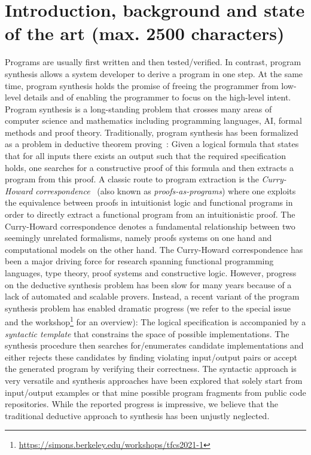 \documentclass[a4paper,12pt]{article}
\begin{document}
\section{Introduction, background and state of the art (max. 2500 characters)}
Programs are usually first written and then tested/verified.
In contrast, program synthesis allows a system developer to derive a program in one step.
At the same time, program synthesis holds the promise of freeing the programmer from low-level details and of enabling the programmer to focus on the high-level intent.
Program synthesis is a long-standing problem that crosses many areas of computer science and mathematics including programming languages, AI, formal methods and proof theory.
Traditionally, program synthesis has been formalized as a problem in deductive theorem proving~\cite{conf/ijcai/MannaW79}:
Given a logical formula that states that for all inputs there exists an output such that the required specification holds, one searches for a constructive proof of this formula and then extracts a program from this proof.
A classic route to program extraction is the \emph{Curry-Howard correspondence}~\cite{girard1989proofs} (also known as \emph{proofs-as-programs}) where one exploits the equivalence between proofs in intuitionist logic and functional programs in order to directly extract a functional program from an intuitionistic proof.
The Curry-Howard correspondence denotes a fundamental relationship between two seemingly unrelated formalisms, namely proofs systems on one hand and computational models on the other hand.
The Curry-Howard correspondence has been a major driving force for research spanning functional programming languages, type theory, proof systems and constructive logic.
However, progress on the deductive synthesis problem has been slow for many years because of a lack of automated and scalable provers.
Instead, a recent variant of the program synthesis problem has enabled dramatic progress (we refer to the special issue~\cite{fisman2022special} and the workshop\footnote{\url{https://simons.berkeley.edu/workshops/tfcs2021-1}} for an overview):
The logical specification is accompanied by a \emph{syntactic template} that constrains the space of possible implementations.
The synthesis procedure then searches for/enumerates candidate implementations and either rejects these candidates by finding violating input/output pairs or accept the generated program by verifying their correctness.
The syntactic approach is very versatile and synthesis approaches have been explored that solely start from input/output examples or that mine possible program fragments from public code repositories.
While the reported progress is impressive, we believe that the traditional deductive approach to synthesis has been unjustly neglected.
\end{document}
